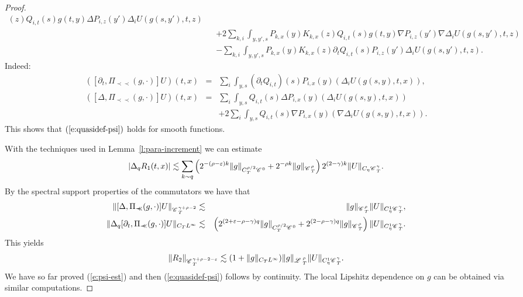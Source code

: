 \documentclass[11pt,reqno]{amsart}
\newcommand{\precprec}{\prec\!\!\!\prec}
\newcommand{\CC}{\mathscr{C} \hspace{.1em}}
\newcommand{\LL}{\mathscr{L} \hspace{.2em}}
\begin{document}
\begin{proof}
\begin{eqnarray}
    (z) Q_{i, t} (s) g (t, y) \Delta P_{i, z} (y') \Delta_i U (g (s, y'), t,
    z) \nonumber\\
    &  & + 2 \sum_{k, i} \int_{y, y', s} P_{k, x} (y) K_{k, x} (z) Q_{i, t}
    (s) g (t, y) \nabla P_{i, z} (y') \nabla \Delta_i U (g (s, y'), t, z)
    \nonumber\\
    &  & - \sum_{k, i} \int_{y, y', s} P_{k, x} (y) K_{k, x} (z) \partial_t
    Q_{i, t} (s) P_{i, z} (y') \Delta_i U (g (s, y'), t, z) .  \label{e:rem-2}
  \end{eqnarray}
  Indeed:
  \begin{eqnarray}
    ([\partial_t, \Pi_{\precprec} (g, \cdot)] U) (t, x) & = & \sum_i \int_{y,
    s} (\partial_t Q_{i, t}) (s) P_{i, x} (y) (\Delta_i U (g (s, y), t, x)),
    \nonumber\\
    ([\Delta, \Pi_{\precprec} (g, \cdot)] U) (t, x) & = & \sum_i \int_{y, s}
    Q_{i, t} (s) \Delta P_{i, x} (y) (\Delta_i U (g (s, y), t, x)) 
    \label{eq:q-time}\\
    &  & + 2 \sum_i \int_{y, s} Q_{i, t} (s) \nabla P_{i, x} (y) (\nabla
    \Delta_i U (g (s, y), t, x)) . \nonumber
  \end{eqnarray}
  This shows that $(\ref{e:quasidef-psi})$ holds for smooth functions.
  
  With the techniques used in Lemma~\ref{l:para-increment} we can estimate
  \[ | \Delta_q R_1 (t, x) | \lesssim \sum_{k \sim q} \left( 2^{- (\rho -
     \varepsilon) k} \| g \|_{C_T^{\rho / 2} \CC^0} + 2^{- \rho k} \| g
     \|_{\CC^{\rho}_T} \right) 2^{(2 - \gamma) k} \| U \|_{C_{\eta}
     \CC^{\gamma}_T} . \]
  By the spectral support properties of the commutators we have that
  \begin{eqnarray*}
    \| [\Delta, \Pi_{\precprec} (g, \cdot)] U \|_{\CC_T^{\gamma + \rho - 2}} &
    \lesssim & \| g \|_{\CC^{\rho}_T} \| U \|_{C^1_{\eta} \CC^{\gamma}_T},\\
    \| \Delta_q [\partial_t, \Pi_{\precprec} (g, \cdot)] U \|_{C_T L^{\infty}}
    & \lesssim & \left( 2^{(2 + \varepsilon - \rho - \gamma) q} \| g
    \|_{C_T^{\rho / 2} \CC^0} + 2^{(2 - \rho - \gamma) q} \| g
    \|_{\CC^{\rho}_T} \right) \| U \|_{C^1_{\eta} \CC^{\gamma}_T} .
  \end{eqnarray*}
  This yields
  \[ \| R_2 \|_{\CC_T^{\gamma + \rho - 2 - \varepsilon}} \lesssim (1 + \| g
     \|_{C_T L^{\infty}}) \| g \|_{\LL^{\rho}_T} \| U \|_{C^1_{\eta}
     \CC^{\gamma}_T} . \]
  We have so far proved (\ref{e:psi-est}) and then (\ref{e:quasidef-psi})
  follows by continuity. The local Lipshitz dependence on $g$ can be obtained
  via similar computations.
\end{proof}
\end{document}
